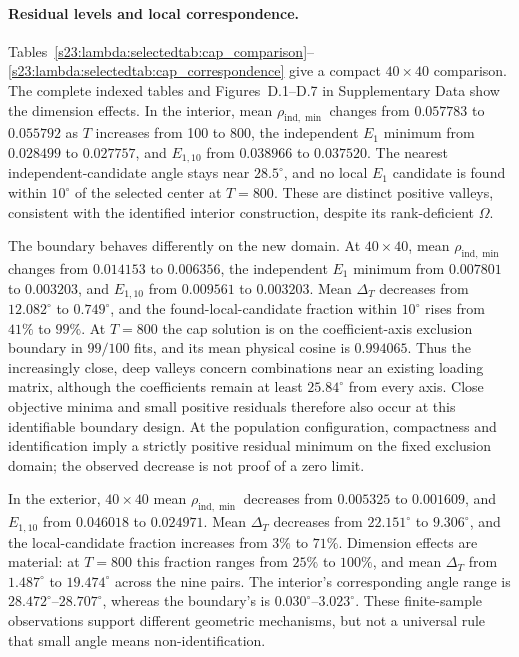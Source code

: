 \documentclass[12pt,letterpaper]{article}
\theoremstyle{plain}
\theoremstyle{definition}
\begin{document}
\paragraph{Residual levels and local correspondence.}
Tables~\ref{s23:lambda:selectedtab:cap_comparison}--\ref{s23:lambda:selectedtab:cap_correspondence}
give a compact $40\times40$ comparison. The complete indexed
tables and Figures~D.1--D.7 in Supplementary Data show the
dimension effects.
In the interior, mean $\rho_{\mathrm{ind},\min}$ changes from
$0.057783$ to $0.055792$ as $T$ increases from 100 to 800,
the independent $E_1$ minimum from $0.028499$ to $0.027757$,
and $E_{1,10}$ from $0.038966$ to $0.037520$.
The nearest independent-candidate angle stays near $28.5^\circ$,
and no local $E_1$ candidate is found within $10^\circ$ of the
selected center at $T=800$. These are distinct positive valleys,
consistent with the identified interior construction, despite its
rank-deficient $\Omega$.

The boundary behaves differently on the new domain. At $40\times40$,
mean $\rho_{\mathrm{ind},\min}$ changes from $0.014153$ to
$0.006356$, the independent $E_1$ minimum from $0.007801$ to
$0.003203$, and $E_{1,10}$ from $0.009561$ to $0.003203$.
Mean $\Delta_T$ decreases from $12.082^\circ$ to $0.749^\circ$,
and the found-local-candidate fraction within $10^\circ$ rises
from $41\%$ to $99\%$. At $T=800$ the cap solution is on the
coefficient-axis exclusion boundary in $99/100$ fits, and its
mean physical cosine is $0.994065$. Thus the increasingly close,
deep valleys concern combinations near an existing loading matrix,
although the coefficients remain at least $25.84^\circ$ from
every axis. Close objective minima and small positive residuals
therefore also occur at this identifiable boundary design. At the
population configuration, compactness and identification imply a
strictly positive residual minimum on the fixed exclusion domain;
the observed decrease is not proof of a zero limit.

In the exterior, $40\times40$ mean
$\rho_{\mathrm{ind},\min}$ decreases from $0.005325$ to $0.001609$,
and $E_{1,10}$ from $0.046018$ to $0.024971$.
Mean $\Delta_T$ decreases from $22.151^\circ$ to $9.306^\circ$,
and the local-candidate fraction increases from $3\%$ to $71\%$.
Dimension effects are material: at $T=800$ this fraction ranges
from $25\%$ to $100\%$, and mean $\Delta_T$ from
$1.487^\circ$ to $19.474^\circ$ across the nine pairs.
The interior's corresponding angle range is
$28.472^\circ$--$28.707^\circ$, whereas the boundary's is
$0.030^\circ$--$3.023^\circ$. These finite-sample observations
support different geometric mechanisms, but not a universal rule
that small angle means non-identification.
\end{document}
